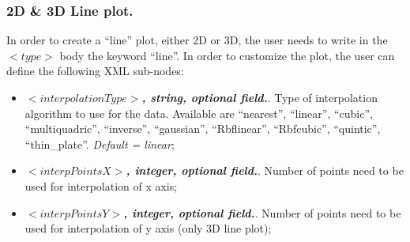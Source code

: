 \subsubsection{2D \& 3D Line plot.}
In order to create a ``line'' plot, either 2D or 3D, the user needs to write in the $<type>$ body the keyword ``line''. In order to customize the plot, the user can define the following XML sub-nodes:
  \begin{itemize}
     \item $<interpolationType>$\textbf{\textit{, string, optional  field.}}. Type of interpolation algorithm to use for the data. Available are ``nearest'', ``linear'', ``cubic'', ``multiquadric'', ``inverse'', ``gaussian'', ``Rbflinear'', ``Rbfcubic'', ``quintic'', ``thin\_plate''. \textit{Default = linear};
     \item $<interpPointsX>$\textbf{\textit{, integer, optional  field.}}. Number of points need to be used for interpolation of x axis;
     \item $<interpPointsY>$\textbf{\textit{, integer, optional  field.}}. Number of points need to be used for interpolation of y axis (only 3D line plot);
    \end{itemize}

